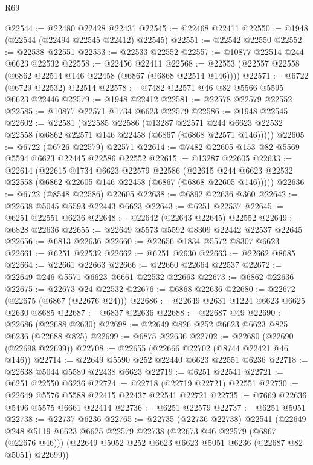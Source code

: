 \begin{lexlean}{R69}
\begin{coremodule}
{@22544 := @22480 @22428 @22431
@22545 := @22468 @22411
@22550 := @1948 (@22544 (@22494 @22545 @22412) @22545)
@22551 := @22542 @22550
@22552 := @22538 @22551
@22553 := @22533 @22552
@22557 := @10877 @22514 @244 @6623 @22532
@22558 := @22456 @22411
@22568 := @22553 (@22557 @22558 (@6862 @22514 @146 @22458 (@6867 (@6868 @22514 @146))))
@22571 := @6722 (@6729 @22532) @22514
@22578 := @7482 @22571 @46 @82 @5566 @5595 @6623 @22446
@22579 := @1948 @22412
@22581 := @22578 @22579 @22552
@22585 := @10877 @22571 @1734 @6623 @22579
@22586 := @1948 @22545
@22602 := @22581
    (@22585
      @22586
      (@13287
        @22571
        @244
        @6623
        @22532
        @22558
        (@6862 @22571 @146 @22458 (@6867 (@6868 @22571 @146)))))
@22605 := @6722 (@6726 @22579) @22571
@22614 := @7482 @22605 @153 @82 @5569 @5594 @6623 @22445 @22586 @22552
@22615 := @13287 @22605
@22633 := @22614
    (@22615
      @1734
      @6623
      @22579
      @22586
      (@22615 @244 @6623 @22532 @22558 (@6862 @22605 @146 @22458 (@6867 (@6868 @22605 @146)))))
@22636 := @6722 (@8548 @22586) @22605
@22638 := @6892 @22636 @360
@22642 := @22638 @5045 @5593 @22443 @6623
@22643 := @6251 @22537
@22645 := @6251 @22551 @6236
@22648 := @22642 (@22643 @22645) @22552
@22649 := @6828 @22636
@22655 := @22649 @5573 @5592 @8309 @22442 @22537 @22645
@22656 := @6813 @22636
@22660 := @22656 @1834 @5572 @8307 @6623
@22661 := @6251 @22532
@22662 := @6251 @2630
@22663 := @22662 @8685
@22664 := @22661 @22663
@22666 := @22660 @22664 @22537
@22672 := @22649 @246 @5571 @6623 @6661 @22532 @22663
@22673 := @6862 @22636
@22675 := @22673 @24 @22532
@22676 := @6868 @22636
@22680 := @22672 (@22675 (@6867 (@22676 @24)))
@22686 := @22649 @2631 @1224 @6623 @6625 @2630 @8685
@22687 := @6837 @22636
@22688 := @22687 @49
@22690 := @22686 (@22688 @2630)
@22698 := @22649 @826 @252 @6623 @6623 @825 @6236 (@22688 @825)
@22699 := @6875 @22636
@22702 := @22680 (@22690 (@22698 @22699))
@22708 := @22655 (@22666 @22702 (@8744 @22421 @46 @146))
@22714 := @22649 @5590 @252 @22440 @6623 @22551 @6236
@22718 := @22638 @5044 @5589 @22438 @6623
@22719 := @6251 @22541
@22721 := @6251 @22550 @6236
@22724 := @22718 (@22719 @22721) @22551
@22730 := @22649 @5576 @5588 @22415 @22437 @22541 @22721
@22735 := @7669 @22636 @5496 @5575 @6661 @22414
@22736 := @6251 @22579
@22737 := @6251 @5051
@22738 := @22737 @6236
@22765 := @22735
    (@22736 @22738)
    @22541
    (@22649
      @248
      @5119
      @6623
      @6625
      @22579
      @22738
      (@22673 @46 @22579 (@6867 (@22676 @46)))
      (@22649 @5052 @252 @6623 @6623 @5051 @6236 (@22687 @82 @5051) @22699))
}
\end{coremodule}
\end{lexlean}
